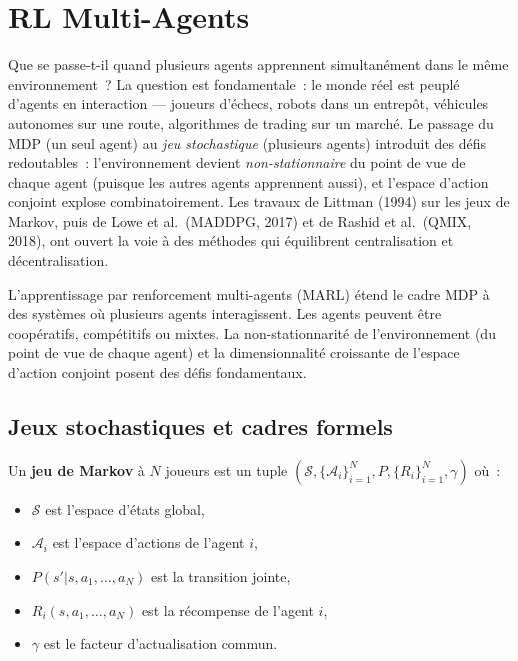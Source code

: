 \chapter{RL Multi-Agents}
\label{ch:multi_agents}

Que se passe-t-il quand plusieurs agents apprennent simultan\'ement dans le m\^eme environnement~? La question est fondamentale~: le monde r\'eel est peupl\'e d'agents en interaction --- joueurs d'\'echecs, robots dans un entrep\^ot, v\'ehicules autonomes sur une route, algorithmes de trading sur un march\'e. Le passage du MDP (un seul agent) au \emph{jeu stochastique} (plusieurs agents) introduit des d\'efis redoutables~: l'environnement devient \emph{non-stationnaire} du point de vue de chaque agent (puisque les autres agents apprennent aussi), et l'espace d'action conjoint explose combinatoirement. Les travaux de Littman (1994) sur les jeux de Markov, puis de Lowe et al.\ (MADDPG, 2017) et de Rashid et al.\ (QMIX, 2018), ont ouvert la voie \`a des m\'ethodes qui \'equilibrent centralisation et d\'ecentralisation.

\begin{intuition}
L'apprentissage par renforcement multi-agents (MARL) \'etend le cadre MDP \`a
des syst\`emes o\`u plusieurs agents interagissent. Les agents peuvent \^etre
coop\'eratifs, comp\'etitifs ou mixtes. La non-stationnarit\'e de l'environnement
(du point de vue de chaque agent) et la dimensionnalit\'e croissante de l'espace
d'action conjoint posent des d\'efis fondamentaux.
\end{intuition}

\section{Jeux stochastiques et cadres formels}

\begin{definition}
Un \textbf{jeu de Markov} \`a $N$ joueurs est un tuple
$(\mathcal{S}, \{\mathcal{A}_i\}_{i=1}^N, P, \{R_i\}_{i=1}^N, \gamma)$ o\`u~:
\begin{itemize}
    \item $\mathcal{S}$ est l'espace d'\'etats global,
    \item $\mathcal{A}_i$ est l'espace d'actions de l'agent $i$,
    \item $P(s' | s, a_1, \ldots, a_N)$ est la transition jointe,
    \item $R_i(s, a_1, \ldots, a_N)$ est la r\'ecompense de l'agent $i$,
    \item $\gamma$ est le facteur d'actualisation commun.
\end{itemize}
\end{definition}

